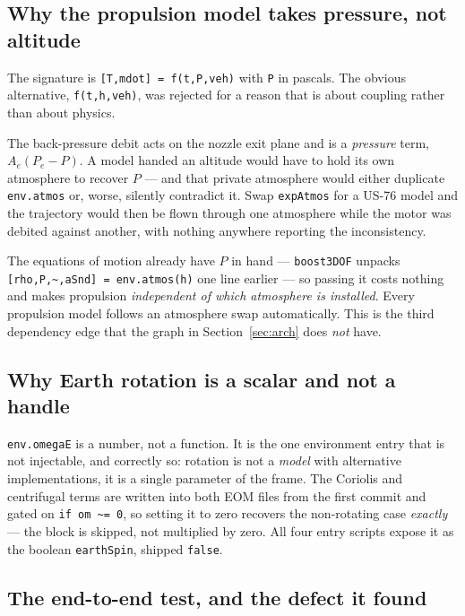 \documentclass[11pt]{article}
\newcommand{\code}[1]{\texttt{#1}}
\begin{document}
\subsection{Why the propulsion model takes pressure, not altitude}
\label{sec:pressure}

The signature is \code{[T,mdot] = f(t,P,veh)} with \code{P} in pascals. The
obvious alternative, \code{f(t,h,veh)}, was rejected for a reason that is about
coupling rather than about physics.

The back-pressure debit acts on the nozzle exit plane and is a \emph{pressure}
term, $A_e(P_e - P)$. A model handed an altitude would have to hold its own
atmosphere to recover $P$ --- and that private atmosphere would either
duplicate \code{env.atmos} or, worse, silently contradict it. Swap
\code{expAtmos} for a US-76 model and the trajectory would then be flown
through one atmosphere while the motor was debited against another, with
nothing anywhere reporting the inconsistency.

The equations of motion already have $P$ in hand --- \code{boost3DOF} unpacks
\code{[rho,P,\textasciitilde,aSnd] = env.atmos(h)} one line earlier --- so
passing it costs nothing and makes propulsion \emph{independent of which
atmosphere is installed}. Every propulsion model follows an atmosphere swap
automatically. This is the third dependency edge that the graph in
Section~\ref{sec:arch} does \emph{not} have.

\subsection{Why Earth rotation is a scalar and not a handle}

\code{env.omegaE} is a number, not a function. It is the one environment entry
that is not injectable, and correctly so: rotation is not a \emph{model} with
alternative implementations, it is a single parameter of the frame. The
Coriolis and centrifugal terms are written into both EOM files from the first
commit and gated on \code{if om \textasciitilde= 0}, so setting it to zero
recovers the non-rotating case \emph{exactly} --- the block is skipped, not
multiplied by zero. All four entry scripts expose it as the boolean
\code{earthSpin}, shipped \code{false}.

\subsection{The end-to-end test, and the defect it found}
\label{sec:injecttest}
\end{document}
